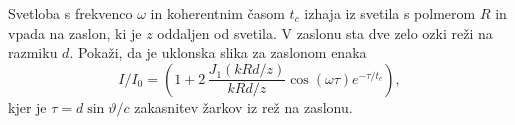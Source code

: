 \begin{definition}
\label{naloga-cittert}
Svetloba s frekvenco $\omega$ in koherentnim časom $t_{c}$ izhaja
iz svetila s polmerom $R$ in vpada na zaslon, ki je $z$ oddaljen od svetila. 
V zaslonu sta dve zelo ozki reži na razmiku $d$. 
Pokaži, da je uklonska slika za zaslonom enaka
\begin{equation}
I/I_{0}=(1+2\,\frac{J_{1}(kRd/z)}{kRd/z}\cos(\omega\tau)e^{-\tau/t_{c}}),
\end{equation}
kjer je $\tau=d\sin\vartheta/c$ zakasnitev žarkov iz rež na zaslonu.
\end{definition}

